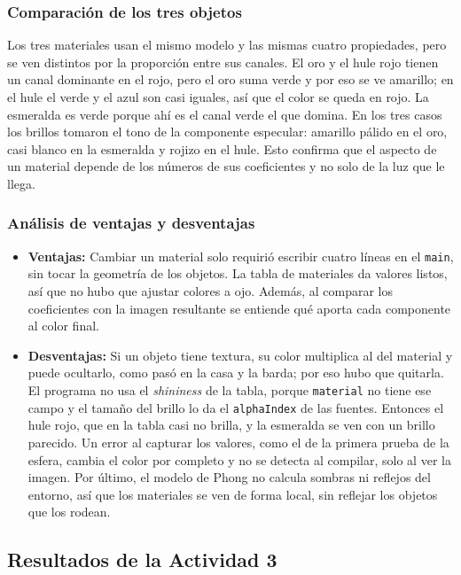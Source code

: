 \subsubsection{Comparación de los tres objetos}
Los tres materiales usan el mismo modelo y las mismas cuatro propiedades, pero se ven distintos por la proporción entre sus canales. El oro y el hule rojo tienen un canal dominante en el rojo, pero el oro suma verde y por eso se ve amarillo; en el hule el verde y el azul son casi iguales, así que el color se queda en rojo. La esmeralda es verde porque ahí es el canal verde el que domina. En los tres casos los brillos tomaron el tono de la componente especular: amarillo pálido en el oro, casi blanco en la esmeralda y rojizo en el hule. Esto confirma que el aspecto de un material depende de los números de sus coeficientes y no solo de la luz que le llega.

\subsubsection{Análisis de ventajas y desventajas}
\begin{itemize}
    \item \textbf{Ventajas:} Cambiar un material solo requirió escribir cuatro líneas en el \texttt{main}, sin tocar la geometría de los objetos. La tabla de materiales da valores listos, así que no hubo que ajustar colores a ojo. Además, al comparar los coeficientes con la imagen resultante se entiende qué aporta cada componente al color final.
    \item \textbf{Desventajas:} Si un objeto tiene textura, su color multiplica al del material y puede ocultarlo, como pasó en la casa y la barda; por eso hubo que quitarla. El programa no usa el \textit{shininess} de la tabla, porque \texttt{material} no tiene ese campo y el tamaño del brillo lo da el \texttt{alphaIndex} de las fuentes. Entonces el hule rojo, que en la tabla casi no brilla, y la esmeralda se ven con un brillo parecido. Un error al capturar los valores, como el de la primera prueba de la esfera, cambia el color por completo y no se detecta al compilar, solo al ver la imagen. Por último, el modelo de Phong no calcula sombras ni reflejos del entorno, así que los materiales se ven de forma local, sin reflejar los objetos que los rodean.
\end{itemize}

\subsection{Resultados de la Actividad 3}
\label{sec:act3_resultados}

